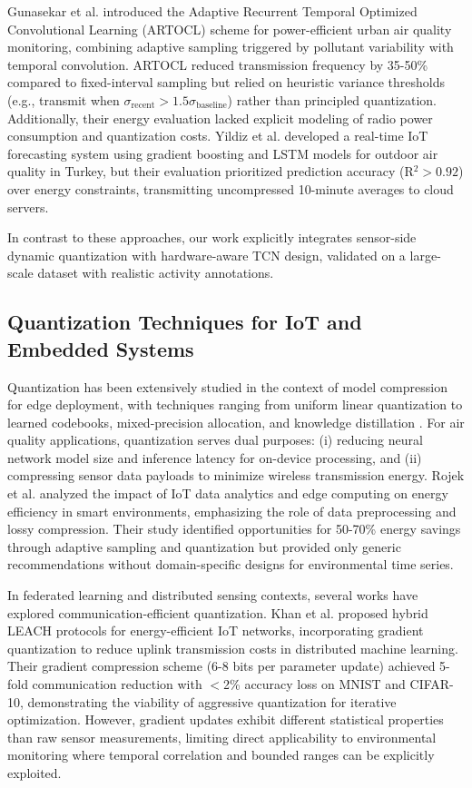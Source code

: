 Gunasekar et al. \cite{gunasekar2025power} introduced the Adaptive Recurrent Temporal Optimized Convolutional Learning (ARTOCL) scheme for power-efficient urban air quality monitoring, combining adaptive sampling triggered by pollutant variability with temporal convolution. ARTOCL reduced transmission frequency by 35-50\% compared to fixed-interval sampling but relied on heuristic variance thresholds (e.g., transmit when $\sigma_{\text{recent}} > 1.5 \sigma_{\text{baseline}}$) rather than principled quantization. Additionally, their energy evaluation lacked explicit modeling of radio power consumption and quantization costs. Yildiz et al. \cite{yildiz2025development} developed a real-time IoT forecasting system using gradient boosting and LSTM models for outdoor air quality in Turkey, but their evaluation prioritized prediction accuracy (R$^2 > 0.92$) over energy constraints, transmitting uncompressed 10-minute averages to cloud servers.

In contrast to these approaches, our work explicitly integrates sensor-side dynamic quantization with hardware-aware TCN design, validated on a large-scale dataset with realistic activity annotations.

\subsection{Quantization Techniques for IoT and Embedded Systems}

Quantization has been extensively studied in the context of model compression for edge deployment, with techniques ranging from uniform linear quantization to learned codebooks, mixed-precision allocation, and knowledge distillation \cite{himeur2024edge}. For air quality applications, quantization serves dual purposes: (i) reducing neural network model size and inference latency for on-device processing, and (ii) compressing sensor data payloads to minimize wireless transmission energy. Rojek et al. \cite{rojek2026impact} analyzed the impact of IoT data analytics and edge computing on energy efficiency in smart environments, emphasizing the role of data preprocessing and lossy compression. Their study identified opportunities for 50-70\% energy savings through adaptive sampling and quantization but provided only generic recommendations without domain-specific designs for environmental time series.

In federated learning and distributed sensing contexts, several works have explored communication-efficient quantization. Khan et al. \cite{khan2024artificial} proposed hybrid LEACH protocols for energy-efficient IoT networks, incorporating gradient quantization to reduce uplink transmission costs in distributed machine learning. Their gradient compression scheme (6-8 bits per parameter update) achieved 5-fold communication reduction with $<$2\% accuracy loss on MNIST and CIFAR-10, demonstrating the viability of aggressive quantization for iterative optimization. However, gradient updates exhibit different statistical properties than raw sensor measurements, limiting direct applicability to environmental monitoring where temporal correlation and bounded ranges can be explicitly exploited.

